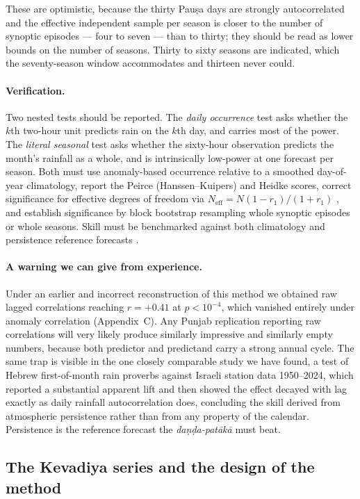 \documentclass[11pt,a4paper]{article}
\newcommand{\skt}[1]{\textcolor{skt}{\textit{#1}}}
\begin{document}
These are optimistic, because the thirty Pauṣa days are strongly autocorrelated and the effective independent sample per season is closer to the number of synoptic episodes --- four to seven --- than to thirty; they should be read as lower bounds on the number of seasons. Thirty to sixty seasons are indicated, which the seventy-season window accommodates and thirteen never could.

\paragraph{Verification.} Two nested tests should be reported. The \emph{daily occurrence} test asks whether the $k$th two-hour unit predicts rain on the $k$th day, and carries most of the power. The \emph{literal seasonal} test asks whether the sixty-hour observation predicts the month's rainfall as a whole, and is intrinsically low-power at one forecast per season. Both must use anomaly-based occurrence relative to a smoothed day-of-year climatology, report the Peirce (Hanssen--Kuipers) and Heidke scores, correct significance for effective degrees of freedom via $N_{\mathrm{eff}}=N(1-r_1)/(1+r_1)$ \cite{wilks,vonstorch}, and establish significance by block bootstrap resampling whole synoptic episodes or whole seasons. Skill must be benchmarked against both climatology and persistence reference forecasts \cite{jolliffe}.

\paragraph{A warning we can give from experience.} Under an earlier and incorrect reconstruction of this method we obtained raw lagged correlations reaching $r=+0.41$ at $p<10^{-4}$, which vanished entirely under anomaly correlation (Appendix~C). Any Punjab replication reporting raw correlations will very likely produce similarly impressive and similarly empty numbers, because both predictor and predictand carry a strong annual cycle. The same trap is visible in the one closely comparable study we have found, a test of Hebrew first-of-month rain proverbs against Israeli station data 1950--2024, which reported a substantial apparent lift and then showed the effect decayed with lag exactly as daily rainfall autocorrelation does, concluding the skill derived from atmospheric persistence rather than from any property of the calendar. Persistence is the reference forecast the \skt{daṇḍa-patākā} must beat.

\subsection{The Kevadiya series and the design of the method}
\label{sec:design}
\end{document}
